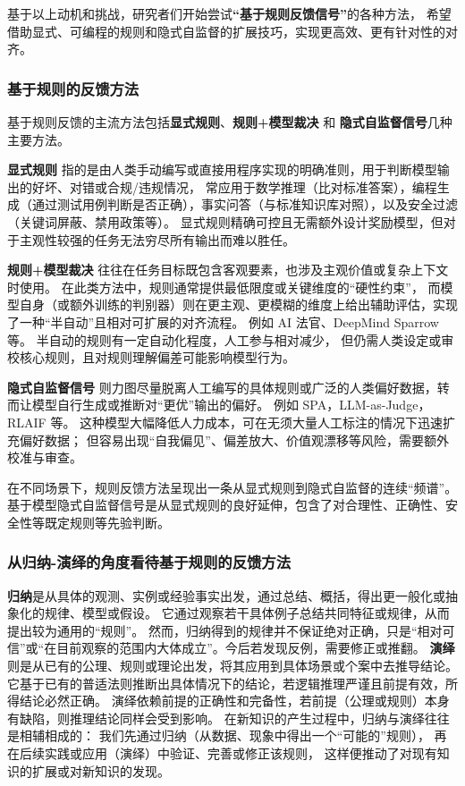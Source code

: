 基于以上动机和挑战，研究者们开始尝试\textbf{“基于规则反馈信号”}的各种方法，
希望借助显式、可编程的规则和隐式自监督的扩展技巧，实现更高效、更有针对性的对齐。 

\subsubsection{基于规则的反馈方法}
基于规则反馈的主流方法包括\textbf{显式规则}、\textbf{规则+模型裁决} 和 \textbf{隐式自监督信号}几种主要方法。

\textbf{显式规则 }指的是由人类手动编写或直接用程序实现的明确准则，用于判断模型输出的好坏、对错或合规/违规情况，
常应用于数学推理（比对标准答案），编程生成（通过测试用例判断是否正确），事实问答（与标准知识库对照），以及安全过滤（关键词屏蔽、禁用政策等）。
显式规则精确可控且无需额外设计奖励模型，但对于主观性较强的任务无法穷尽所有输出而难以胜任。

\textbf{规则+模型裁决 }往往在任务目标既包含客观要素，也涉及主观价值或复杂上下文时使用。
在此类方法中，规则通常提供最低限度或关键维度的“硬性约束”，
而模型自身（或额外训练的判别器）则在更主观、更模糊的维度上给出辅助评估，实现了一种“半自动”且相对可扩展的对齐流程。
例如 AI 法官\citep{bai2022constitutional}、DeepMind Sparrow 等。
半自动的规则有一定自动化程度，人工参与相对减少，
但仍需人类设定或审校核心规则，且对规则理解偏差可能影响模型行为。

\textbf{隐式自监督信号 }则力图尽量脱离人工编写的具体规则或广泛的人类偏好数据，转而让模型自行生成或推断对“更优”输出的偏好。
例如 SPA\citep{Kim2025Spread}，LLM-as-Judge\citep{Li2024LLMs}，RLAIF\citep{Lee2024Rlaif} 等。
这种模型大幅降低人力成本，可在无须大量人工标注的情况下迅速扩充偏好数据；
但容易出现“自我偏见”、偏差放大、价值观漂移等风险，需要额外校准与审查。

在不同场景下，规则反馈方法呈现出一条从显式规则到隐式自监督的连续“频谱”。
基于模型隐式自监督信号是从显式规则的良好延伸，包含了对合理性、正确性、安全性等既定规则等先验判断。

\subsubsection{从归纳-演绎的角度看待基于规则的反馈方法}
\textbf{归纳}是从具体的观测、实例或经验事实出发，通过总结、概括，得出更一般化或抽象化的规律、模型或假设。
它通过观察若干具体例子总结共同特征或规律，从而提出较为通用的“规则”。
然而，归纳得到的规律并不保证绝对正确，只是“相对可信”或“在目前观察的范围内大体成立”。今后若发现反例，需要修正或推翻。
\textbf{演绎}则是从已有的公理、规则或理论出发，将其应用到具体场景或个案中去推导结论。
它基于已有的普适法则推断出具体情况下的结论，若逻辑推理严谨且前提有效，所得结论必然正确。
演绎依赖前提的正确性和完备性，若前提（公理或规则）本身有缺陷，则推理结论同样会受到影响。
在新知识的产生过程中，归纳与演绎往往是相辅相成的：
我们先通过归纳（从数据、现象中得出一个“可能的”规则），
再在后续实践或应用（演绎）中验证、完善或修正该规则，
这样便推动了对现有知识的扩展或对新知识的发现。

